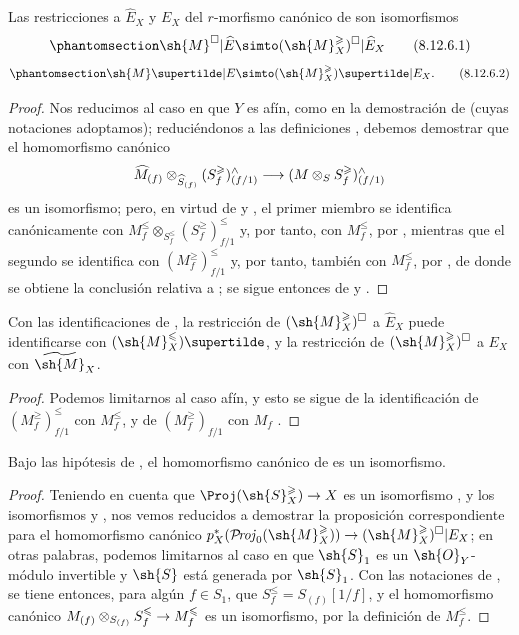 \documentclass[oneside,10pt]{amsart}
\makeatletter
\renewcommand{\leq}{\leqslant}
\renewcommand{\geq}{\geqslant}
\newcommand{\ega@arrow}[2]{\mathchoice{#1}{#2}{#2}{#2}}
\renewcommand{\to}{\ega@arrow{\longrightarrow}{\rightarrow}}
\def\shProj{\mathcal{P}\!\mathit{roj}}
\newcommand{\oldpage}[2][]{\marginnote{\normalfont\footnotesize\textbf{#1}~|~#2}\ignorespaces}
\let\EGAOriginalLabel\label
\renewcommand{\label}[1]{\phantomsection\EGAOriginalLabel{#1}}
\makeatother
\begin{document}
\begin{proposition}[8.12.6]
\label{II.8.12.6}
Las restricciones a $\widehat{E}_X$ y $E_X$ del $r$-morfismo canónico de  son isomorfismos
\[
\label{II.8.12.6.1}
    \sh{M}^\square|\widehat{E} \simto (\sh{M}_X^\geq)^\square|\widehat{E}_X
\tag{8.12.6.1}
\]
\[
\label{II.8.12.6.2}
    \sh{M}\supertilde|E \simto (\sh{M}_X^\geq)\supertilde|E_X.
\tag{8.12.6.2}
\]
\end{proposition}

\begin{proof}
Nos reducimos al caso en que $Y$ es afín, como en la demostración de  (cuyas notaciones adoptamos);
reduciéndonos a las definiciones , debemos demostrar que el homomorfismo canónico
\[
    \widehat{M}_{(f)}\otimes_{\widehat{S}_{(f)}}(S_f^\geq)_{(f/1)}^\wedge \to (M\otimes_S S_f^\geq)_{(f/1)}^\wedge
\]
es un isomorfismo;
pero, en virtud de  y , el primer miembro se identifica canónicamente con $M_f^\leq\otimes_{S_f^\leq}(S_f^\geq)_{f/1}^\leq$ y, por tanto, con $M_f^\leq$, por , mientras que el segundo se identifica con $(M_f^\geq)_{f/1}^\leq$ y, por tanto, también con $M_f^\leq$, por , de donde se obtiene la conclusión relativa a ;
 se sigue entonces de  y .
\end{proof}

\begin{corollary}[8.12.7]
\label{II.8.12.7}
Con las identificaciones de , la restricción de $(\sh{M}_X^\geq)^\square$ a $\widehat{E}_X$ puede identificarse con $(\sh{M}_X^\leq)\supertilde$, y la restricción de $(\sh{M}_X^\geq)^\square$ a $E_X$ con $\widetilde{\sh{M}}_X$.
\end{corollary}

\begin{proof}
Podemos limitarnos al caso afín, y esto se sigue de la identificación de $(M_f^\geq)_{f/1}^\leq$ con $M_f^\leq$, y de $(M_f^\geq)_{f/1}$ con $M_f$ .
\end{proof}

\begin{proposition}[8.12.8]
\label{II.8.12.8}
Bajo las hipótesis de , el homomorfismo canónico de  es un isomorfismo.
\end{proposition}

\begin{proof}
Teniendo en cuenta que $\Proj(\sh{S}_X^\geq)\to X$ es un isomorfismo , y los
\oldpage[II]{195}
isomorfismos  y , nos vemos reducidos a demostrar la proposición correspondiente para el homomorfismo canónico $p_X^*(\shProj_0(\sh{M}_X^\geq))\to(\sh{M}_X^\geq)^\square|E_X$; en otras palabras, podemos limitarnos al caso en que $\sh{S}_1$ es un $\sh{O}_Y$-módulo invertible y $\sh{S}$ está generada por $\sh{S}_1$.
Con las notaciones de , se tiene entonces, para algún $f\in S_1$, que $S_f^\leq=S_{(f)}[1/f]$, y el homomorfismo canónico $M_{(f)}\otimes_{S_{(f)}}S_f^\leq\to M_f^\leq$ es un isomorfismo, por la definición de $M_f^\leq$.
\end{proof}
\end{document}
